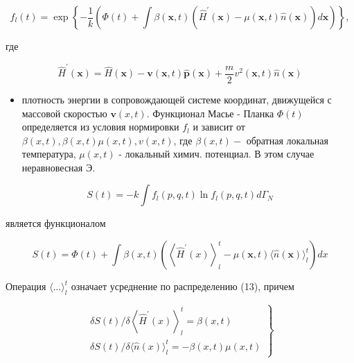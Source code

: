 \documentclass[10pt]{article}
\begin{document}
\[

f_{l}(t)=\exp \left\{-\frac{1}{k}\left(\Phi(t)+\int \beta(\boldsymbol{x}, t)\left(\hat{H}^{\prime}(\boldsymbol{x})-\mu(\boldsymbol{x}, t) \hat{n}(\boldsymbol{x})\right) d \boldsymbol{x}\right)\right\},

\]



где



\[

\hat{H}^{\prime}(\boldsymbol{x})=\hat{H}(\boldsymbol{x})-\boldsymbol{v}(\boldsymbol{x}, t) \hat{\boldsymbol{p}}(\boldsymbol{x})+\frac{m}{2} v^{2}(\boldsymbol{x}, t) \hat{n}(\boldsymbol{x})

\]



\begin{itemize}

  \item плотность энергии в сопровождающей системе координат, движущейся с массовой скоростью $\boldsymbol{v}(x, t)$. Функционал Масье - Планка $\Phi(t)$ определяется из условия нормировки $f_{l}$ и зависит от $\beta(x, t), \beta(x, t) \mu(x, t), v(x, t)$, где $\beta(x, t)-$ обратная локальная температура, $\mu(x, t)$ - локальный химич. потенциал. В этом случае неравновесная $Э$.

\end{itemize}



\[

S(t)=-k \int f_{l}(p, q, t) \ln f_{l}(p, q, t) d \Gamma_{N}

\]



является функционалом



\[

S(t)=\Phi(t)+\int \beta(x, t)\left(\left\langle\hat{H}^{\prime}(x)\right\rangle_{l}^{t}-\mu(\boldsymbol{x}, t)\langle\hat{n}(\boldsymbol{x})\rangle_{l}^{t}\right) d x

\]



Операция $\langle\ldots\rangle_{l}^{t}$ означает усреднение по распределению (13), причем



\[

\left.\begin{array}{l}

\delta S(t) / \delta\left\langle\hat{H}^{\prime}(x)\right\rangle_{l}^{t}=\beta(x, t) \\

\delta S(t) / \delta\langle\hat{n}(x)\rangle_{l}^{t}=-\beta(x, t) \mu(x, t)

\end{array}\right\}

\]
\end{document}
